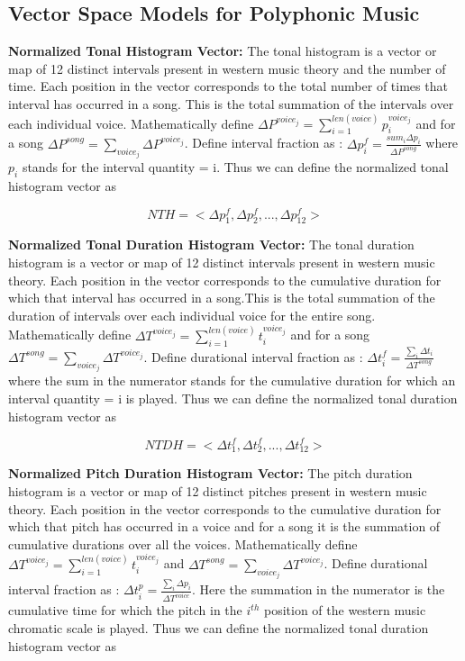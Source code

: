 \subsection{Vector Space Models for Polyphonic Music} 

\noindent \textbf{Normalized Tonal Histogram Vector:} The tonal histogram is a vector or map of 12 distinct intervals present in western music theory and the number of time. Each position in the vector corresponds to the total number of times that interval has occurred in a song. This is the total summation of the intervals over each individual voice. Mathematically define $\Delta P^{voice_j} = \sum_{i=1}^{len(voice)} p_i^{voice_j}$ and for a song $\Delta P^{song} = \sum_{voice_j} \Delta P^{voice_j}$. Define interval fraction as : $\Delta p^f_i = \frac{sum_i \Delta p_i}{\Delta P^{song}}$ where $p_i$ stands for the interval quantity = i. Thus we can define the normalized tonal histogram vector as

\begin{equation}
NTH = <\Delta p^f_1, \Delta p^f_2, ... , \Delta p^f_{12}>
\end{equation}

\noindent \textbf{Normalized Tonal Duration Histogram Vector:} The tonal duration histogram is a vector or map of 12 distinct intervals present in western music theory. Each position in the vector corresponds to the cumulative duration for which that interval has occurred in a song.This is the total summation of the duration of intervals over each individual voice for the entire song. Mathematically define $\Delta T^{voice_j} = \sum_{i=1}^{len(voice)} t_i^{voice_j}$ and for a song $\Delta T^{song} = \sum_{voice_j} \Delta T^{voice_j}$. Define durational interval fraction as : $\Delta t^f_i = \frac{\sum_i \Delta t_i}{\Delta T^{song}}$ where the sum in the numerator stands for the cumulative duration for which an interval quantity = i is played. Thus we can define the normalized tonal duration histogram vector as

\begin{equation}
NTDH = <\Delta t^f_1, \Delta t^f_2, ... , \Delta t^f_{12}>
\end{equation}

\noindent \textbf{Normalized Pitch Duration Histogram Vector:}  The pitch duration histogram is a vector or map of 12 distinct pitches present in western music theory. Each position in the vector corresponds to the cumulative duration for which that pitch has occurred in a voice and for a song it is the summation of cumulative durations over all the voices. Mathematically define $\Delta T^{voice_j} = \sum_{i=1}^{len(voice)} t_i^{voice_j}$ and $\Delta T^{song} = \sum_{voice_j} \Delta T^{voice_j}$. Define durational interval fraction as : $\Delta t^p_i = \frac{\sum_i \Delta p_i}{\Delta T^{voice}}$. Here the summation in the numerator is the cumulative time for which the pitch in the $i^{th}$ position of the western music chromatic scale is played. Thus we can define the normalized tonal duration histogram vector as

